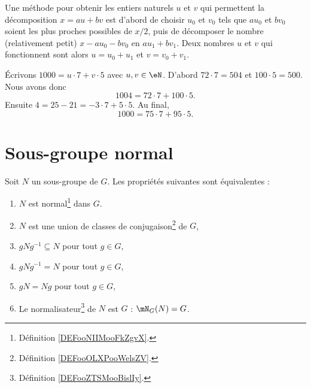\begin{normaltext}
	Une méthode pour obtenir les entiers naturels \( u\) et \( v\) qui permettent la décomposition \(x = au + bv \) est d'abord de choisir \( u_0\) et \( v_0\) tels que \( au_0 \) et \( bv_0 \) soient les plus proches possibles de \( x/2\), puis de décomposer le nombre (relativement petit) \( x - au_0 - bv_0 \) en \( au_1 + bv_1 \). Deux nombres \( u\) et \( v\) qui fonctionnent sont alors \( u = u_0 + u_1\) et \( v = v_0 + v_1\).
\end{normaltext}

\begin{example}
	Écrivons \( 1000=u\cdot 7+v\cdot 5\) avec \( u,v\in \eN\). D'abord \( 72\cdot 7=504\) et \( 100\cdot 5=500\). Nous avons donc
	\begin{equation}
		1004=72\cdot 7+100\cdot 5.
	\end{equation}
	Ensuite \( 4=25-21=-3\cdot 7+5\cdot 5\). Au final,
	\begin{equation}
		1000=75\cdot 7+95\cdot 5.
	\end{equation}
\end{example}


\section{Sous-groupe normal}

\begin{proposition}\label{propGroupeNormal}
	Soit \( N\) un sous-groupe de \( G\). Les propriétés suivantes sont équivalentes :
	\begin{enumerate}
		\item       \label{ITEMooDYEUooOuKEqQ}
		      \( N\) est normal\footnote{Définition \ref{DEFooNIIMooFkZgvX}.} dans \( G\).
		\item       \label{ITEMooPYTEooZhvrUa}
		      \( N\) est une union de classes de conjugaison\footnote{Définition \ref{DEFooOLXPooWelsZV}.} de \( G\),
		\item       \label{ITEMooJWTLooBRmriQ}
		      \( gNg^{-1}\subseteq N\) pour tout \( g\in G\),
		\item       \label{ITEMooVRZIooAorhRY}
		      \( gNg^{-1}= N\) pour tout \( g\in G\),
		\item       \label{ITEMooJGUOooYshOZa}
		      \( gN=Ng\) pour tout \( g\in G\),
		\item       \label{ITEMooMRYRooZifCCe}
		      Le normalisateur\footnote{Définition \ref{DEFooZTSMooBislIy}.} de \( N\) est \( G\) : \( \mN_G(N)=G\).
	\end{enumerate}
\end{proposition}

